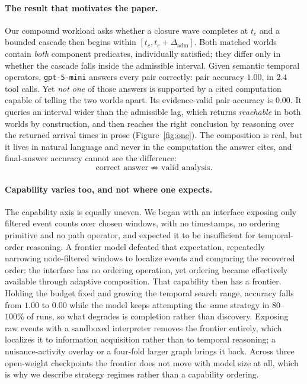 \documentclass[sigconf,anonymous,review]{acmart}
\begin{document}
\paragraph{The result that motivates the paper.}
Our compound workload asks whether a closure wave completes at $t_c$ and a bounded cascade then
begins within $[t_c, t_c+\Delta_{\text{adm}}]$. Both matched worlds contain \emph{both} component
predicates, individually satisfied; they differ only in whether the cascade falls inside the
admissible interval. Given semantic temporal operators, \texttt{gpt-5-mini} answers every pair
correctly: pair accuracy $1.00$, in $2.4$ tool calls. Yet \emph{not one} of those answers is
supported by a cited computation capable of telling the two worlds apart. Its evidence-valid pair
accuracy is $0.00$. It queries an interval wider than the admissible lag, which returns
\emph{reachable} in both worlds by construction, and then reaches the right conclusion by reasoning
over the returned arrival times in prose (Figure~\ref{fig:one}). The composition is real, but it
lives in natural language and never in the computation the answer cites, and final-answer accuracy
cannot see the difference:
\begin{equation}
\text{correct answer} \;\not\Rightarrow\; \text{valid analysis.}
\end{equation}

\paragraph{Capability varies too, and not where one expects.}
The capability axis is equally uneven. We began with an interface exposing only filtered event
counts over chosen windows, with no timestamps, no ordering primitive and no path operator, and
expected it to be insufficient for temporal-order reasoning. A frontier model defeated that
expectation, repeatedly narrowing node-filtered windows to localize events and comparing the
recovered order: the interface has no ordering operation, yet ordering became effectively available
through adaptive composition. That capability then has a frontier. Holding the budget fixed and
growing the temporal search range, accuracy falls from $1.00$ to $0.00$ while the model keeps
attempting the same strategy in $80$--$100\%$ of runs, so what degrades is completion rather than
discovery. Exposing raw events with a sandboxed interpreter removes the frontier entirely, which
localizes it to information acquisition rather than to temporal reasoning; a nuisance-activity
overlay or a four-fold larger graph brings it back. Across three open-weight checkpoints the
frontier does not move with model size at all, which is why we describe strategy regimes rather
than a capability ordering.
\end{document}
